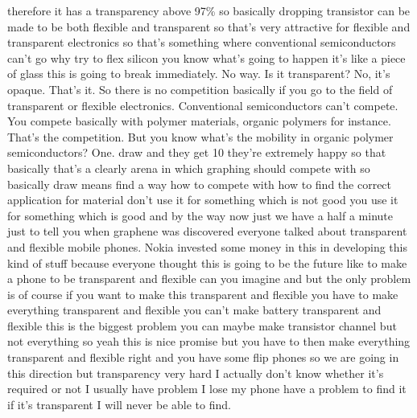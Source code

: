 therefore it has a transparency above 97\% so basically dropping transistor can be made to be both flexible and transparent so that's very attractive for flexible and transparent electronics so that's something where conventional semiconductors can't go why try to flex silicon you know what's going to happen it's like a piece of glass this is going to break immediately. No way. Is it transparent? No, it's opaque. That's it. So there is no competition basically if you go to the field of transparent or flexible electronics. Conventional semiconductors can't compete. You compete basically with polymer materials, organic polymers for instance. That's the competition. But you know what's the mobility in organic polymer semiconductors? One. draw and they get 10 they're extremely happy so that basically that's a clearly arena in which graphing should compete with so basically draw means find a way how to compete with how to find the correct application for material don't use it for something which is not good you use it for something which is good and by the way now just we have a half a minute just to tell you when graphene was discovered everyone talked about transparent and flexible mobile phones. Nokia invested some money in this in developing this kind of stuff because everyone thought this is going to be the future like to make a phone to be transparent and flexible can you imagine and but the only problem is of course if you want to make this transparent and flexible you have to make everything transparent and flexible you can't make battery transparent and flexible this is the biggest problem you can maybe make transistor channel but not everything so yeah this is nice promise but you have to then make everything transparent and flexible right and you have some flip phones so we are going in this direction but transparency very hard I actually don't know whether it's required or not I usually have problem I lose my phone have a problem to find it if it's transparent I will never be able to find.